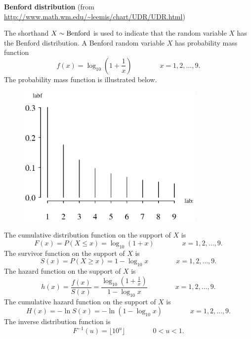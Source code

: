 \documentclass[12pt,fullpage]{article}
\begin{document}
\noindent
{\bf Benford distribution} (from \color{blue}\url{http://www.math.wm.edu/~leemis/chart/UDR/UDR.html}\color{black})

\noindent
The shorthand $X \sim {\rm Benford}$ is used to indicate that the
random variable $X$ has the Benford distribution.
A Benford random variable $X$ has probability mass function 
$$
f(x) = \log_{10}\left(1 + \frac{1} {x}\right) \qquad \qquad x = 1,2,\ldots,9.
$$
The probability mass function is illustrated below.

\begin{figure}[h!]
\begin{center}
\includegraphics[width=3.6in]{BenfordPlot.ps}
\end{center}
\end{figure}

\noindent The cumulative distribution function on the support of $X$ is
$$
F(x) = P(X \le x) = \log_{10} (1+x) \qquad \qquad x = 1,2,\ldots,9.
$$
The survivor function on the support of $X$ is
$$
S(x) = P(X \ge x) = 1- \log_{10} x \qquad \qquad x = 1,2,\ldots,9.
$$
The hazard function on the support of $X$ is
$$
h(x) = \frac{f(x)}{S(x)} = \frac{\log_{10}\left(1+\frac{1}{x}\right)}{1- \log_{10}x}  \qquad \qquad x = 1,2,\ldots,9.
$$
The cumulative hazard function on the support of $X$ is
$$
H(x) = - \ln S(x) = -\ln (1- \log_{10}x)  \qquad \qquad x = 1,2,\ldots,9.
$$
The inverse distribution function is
$$
F ^ {-1}(u) = \lfloor 10^{u} \rfloor \qquad \qquad 0<u<1.
$$
\end{document}
